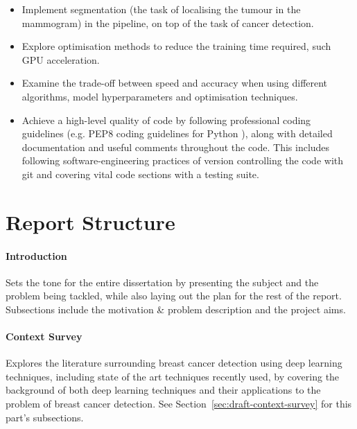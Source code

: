\begin{itemize}
    \item Implement segmentation (the task of localising the tumour in the mammogram) in the pipeline, on top of the task of cancer detection.
    \item Explore optimisation methods to reduce the training time required, such  GPU acceleration.
    \item Examine the trade-off between speed and accuracy when using different algorithms, model hyperparameters and optimisation techniques.
    \item Achieve a high-level quality of code by following professional coding guidelines (e.g. PEP8 coding guidelines for Python \cite{pep8}), along with detailed documentation and useful comments throughout the code. This includes following software-engineering practices of version controlling the code with git and covering vital code sections with a testing suite.
\end{itemize}


\section{Report Structure}

\paragraph{Introduction}
Sets the tone for the entire dissertation by presenting the subject and the problem being tackled, while also laying out the plan for the rest of the report. Subsections include the motivation \& problem description and the project aims.

\paragraph{Context Survey}
Explores the literature surrounding breast cancer detection using deep learning techniques, including state of the art techniques recently used, by covering the background of both deep learning techniques and their applications to the problem of breast cancer detection. See Section~\ref{sec:draft-context-survey} for this part's subsections.

